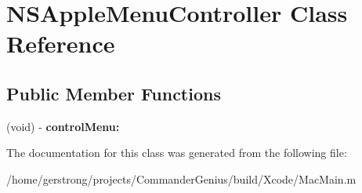 \hypertarget{interface_n_s_apple_menu_controller}{
\section{NSAppleMenuController Class Reference}
\label{interface_n_s_apple_menu_controller}
}
\subsection*{Public Member Functions}
\begin{DoxyCompactItemize}
\item 
\hypertarget{interface_n_s_apple_menu_controller_a89ef84c10361462cfa9b54cf15a820c7}{
(void) -\/ {\bfseries controlMenu:}}
\label{interface_n_s_apple_menu_controller_a89ef84c10361462cfa9b54cf15a820c7}

\end{DoxyCompactItemize}


The documentation for this class was generated from the following file:\begin{DoxyCompactItemize}
\item 
/home/gerstrong/projects/CommanderGenius/build/Xcode/MacMain.m\end{DoxyCompactItemize}
